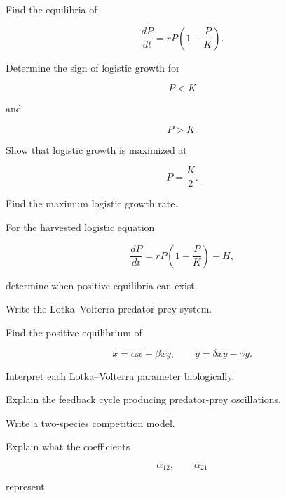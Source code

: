 \begin{exercise}[2]
Find the equilibria of

\[
\frac{dP}{dt}
=
rP
\left(
1-\frac{P}{K}
\right).
\]
\end{exercise}

\begin{exercise}[2]
Determine the sign of logistic growth for

\[
P<K
\]

and

\[
P>K.
\]
\end{exercise}

\begin{exercise}[3]
Show that logistic growth is maximized at

\[
P=\frac{K}{2}.
\]
\end{exercise}

\begin{exercise}[3]
Find the maximum logistic growth rate.
\end{exercise}

\begin{exercise}[3]
For the harvested logistic equation

\[
\frac{dP}{dt}
=
rP
\left(
1-\frac{P}{K}
\right)
-
H,
\]

determine when positive equilibria can exist.
\end{exercise}

\begin{exercise}[2]
Write the Lotka--Volterra predator-prey system.
\end{exercise}

\begin{exercise}[3]
Find the positive equilibrium of

\[
\dot{x}
=
\alpha x-\beta xy,
\qquad
\dot{y}
=
\delta xy-\gamma y.
\]
\end{exercise}

\begin{exercise}[3]
Interpret each Lotka--Volterra parameter biologically.
\end{exercise}

\begin{exercise}[3]
Explain the feedback cycle producing predator-prey oscillations.
\end{exercise}

\begin{exercise}[3]
Write a two-species competition model.
\end{exercise}

\begin{exercise}[3]
Explain what the coefficients

\[
\alpha_{12},
\qquad
\alpha_{21}
\]

represent.
\end{exercise}

